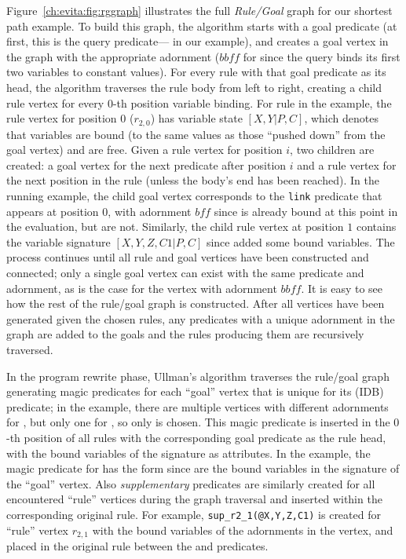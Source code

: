 Figure~\ref{ch:evita:fig:rggraph} illustrates the full {\em Rule/Goal} graph for our 
shortest path example.  To build this graph, the algorithm starts with a goal 
predicate (at first, this is the query predicate--- in our example), and creates 
a goal vertex in the graph with the appropriate adornment ($\mathit{bbff}$ for
 since the query binds its first two variables to constant values). For every
rule with that goal predicate as its head, the algorithm traverses the
rule body from left to right, creating a child rule vertex for every
$0$-th position variable binding.  For rule  in the example, the
rule vertex for position $0$ ($r_{2,0}$) has variable state $[X,Y|P,C]$,
which denotes that variables  are bound (to the same values as
those ``pushed down'' from the goal vertex) and  are free.
Given a rule vertex for position $i$, two children are created: a goal
vertex for the next predicate after position $i$ and a rule vertex for
the next position in the rule (unless the body's end has been reached).
In the running example, the child goal vertex corresponds to the {\tt link} 
predicate that appears at position $0$, with adornment $\mathit{bff}$ 
since  is already bound at this point in the evaluation, but  are not.  
Similarly, the child rule vertex at position $1$ contains the variable signature 
$[X,Y,Z,C1|P,C]$ since  added some bound variables.  The process 
continues until all rule and goal vertices have been constructed and connected; 
only a single goal vertex can exist with the same predicate and
adornment, as is the case for the  vertex with adornment
$\mathit{bbff}$.  It is easy to see how the rest of the rule/goal graph is 
constructed. After all vertices have been generated given the chosen rules, 
any predicates with a unique adornment in the graph are added to the goals 
and the rules producing them are recursively traversed.


In the program rewrite phase, Ullman's algorithm traverses the rule/goal
graph generating magic predicates for each ``goal'' vertex that is
unique for its (IDB) predicate; in the example, there are multiple vertices
with different adornments for , but only one for ,
so only  is chosen.  This magic predicate is inserted in
the $0$-th position of all rules with the corresponding goal predicate
as the rule head, with the bound variables of the signature as
attributes. In the example, the magic predicate for  has the
form  since  are the bound 
variables in the signature of the ``goal'' vertex.  Also
\emph{supplementary} predicates are similarly created for all
encountered ``rule'' vertices during the graph traversal and inserted
within the corresponding original rule.  For example, {\tt sup\_r2\_1(@X,Y,Z,C1)} 
is created for ``rule'' vertex $r_{2,1}$ with the bound variables of
the adornments in the vertex, and placed in the original rule 
between the  and  predicates.


